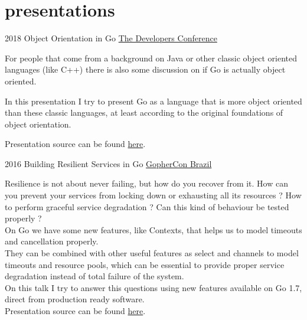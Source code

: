 \documentclass[]{friggeri-cv} %
\begin{document}
\section{presentations}

\begin{entrylist}
\entry
{2018}
{Object Orientation in Go}
{\href{http://www.thedevelopersconference.com.br/tdc/2018/florianopolis/trilha-golang}{The Developers Conference}}
{

For people that come from a background on Java or other classic object oriented languages
(like C++) there is also some discussion on if Go is actually object oriented.

In this presentation I try to present Go as a language that is more object oriented than these
classic languages, at least according to the original foundations of object orientation.

Presentation source can be found \href{https://github.com/katcipis/my.presentations/blob/master/gooo/gooo.slide}{here}.

}
\end{entrylist}

\begin{entrylist}
\entry
{2016}
{Building Resilient Services in Go}
{\href{https://2016.gopherconbr.org/en/}{GopherCon Brazil}}
{

Resilience is not about never failing, but how do you recover from it.
How can you prevent your services from locking down or exhausting all its resources ?
How to perform graceful service degradation ? Can this kind of behaviour be tested properly ?\\

On Go we have some new features, like Contexts, that helps us to model timeouts and cancellation properly.\\

They can be combined with other useful features as select and channels to model timeouts and resource pools,
which can be essential to provide proper service degradation instead of total failure of the system.\\

On this talk I try to answer this questions using new features available on Go 1.7, direct from production ready software.\\

Presentation source can be found \href{https://github.com/katcipis/my.presentations/tree/master/resilient-services-in-go}{here}.

}
\end{entrylist}
\end{document}
